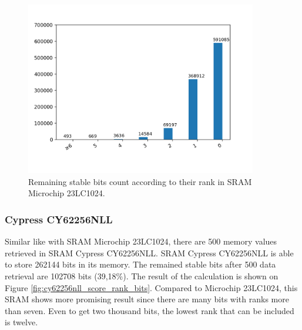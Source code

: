 \begin{figure}[tph!]
    \centerline{\includegraphics[width={0.9\textwidth}]{images/23lc1024_score_rank_bits}}
    \caption{Remaining stable bits count according to their rank in SRAM Microchip 23LC1024.}
    \label{fig:23lc1024_score_rank_bits}
\end{figure}

\subsubsection{Cypress CY62256NLL}
Similar like with SRAM Microchip 23LC1024, there are 500 memory values retrieved in SRAM Cypress CY62256NLL.
SRAM Cypress CY62256NLL is able to store 262144 bits in its memory. The remained stable bits after 500 data retrieval are 102708 bits (39,18\%).
The result of the calculation is shown on Figure \ref{fig:cy62256nll_score_rank_bits}. Compared to Microchip 23LC1024, this SRAM shows more promising result since there are many bits with ranks more than seven. Even to get two thousand bits, the lowest rank that can be included is twelve.

